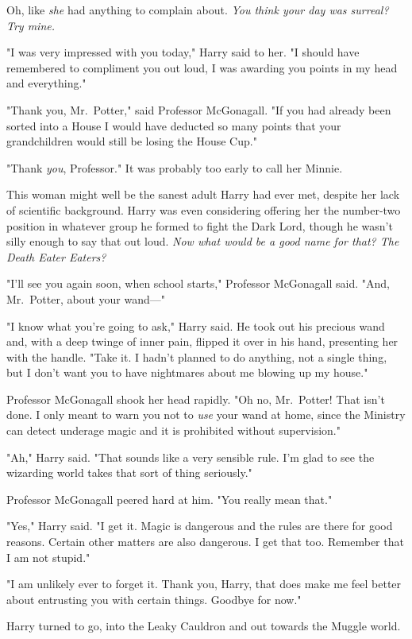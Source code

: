 Oh, like \emph{she} had anything to complain about. \emph{You think your day
was surreal? Try mine.}

"I was very impressed with you today," Harry said to her. "I should have
remembered to compliment you out loud, I was awarding you points in my head and
everything."

"Thank you, Mr.~Potter," said Professor McGonagall. "If you had already been
sorted into a House I would have deducted so many points that your
grandchildren would still be losing the House Cup."

"Thank \emph{you}, Professor." It was probably too early to call her Minnie.

This woman might well be the sanest adult Harry had ever met, despite her lack
of scientific background. Harry was even considering offering her the
number-two position in whatever group he formed to fight the Dark Lord, though
he wasn't silly enough to say that out loud. \emph{Now what would be a good
name for that{\el}? The Death Eater Eaters?}

"I'll see you again soon, when school starts," Professor McGonagall said. "And,
Mr.~Potter, about your wand—"

"I know what you're going to ask," Harry said. He took out his precious wand
and, with a deep twinge of inner pain, flipped it over in his hand, presenting
her with the handle. "Take it. I hadn't planned to do anything, not a single
thing, but I don't want you to have nightmares about me blowing up my house."

Professor McGonagall shook her head rapidly. "Oh no, Mr.~Potter! That isn't
done. I only meant to warn you not to \emph{use} your wand at home, since the
Ministry can detect underage magic and it is prohibited without supervision."

"Ah," Harry said. "That sounds like a very sensible rule. I'm glad to see the
wizarding world takes that sort of thing seriously."

Professor McGonagall peered hard at him. "You really mean that."

"Yes," Harry said. "I get it. Magic is dangerous and the rules are there for
good reasons. Certain other matters are also dangerous. I get that too.
Remember that I am not stupid."

"I am unlikely ever to forget it. Thank you, Harry, that does make me feel
better about entrusting you with certain things. Goodbye for now."

Harry turned to go, into the Leaky Cauldron and out towards the Muggle world.

